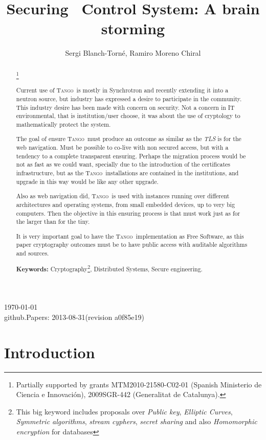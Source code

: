 \documentclass[10pt,a4paper,twoside]{llncs}
\title{Securing \tango\, Control System: A brain storming}
\author{Sergi Blanch-Torn\'e\inst{1}, Ramiro Moreno Chiral\inst{2}}
\institute{
 Escola Polit\`ecnica Superior, Universitat de Lleida. Spain.\\
 \email{\tt sblanch@alumnes.udl.es}
 \and 
 Departament de Matem\`atica. Universitat de Lleida. Spain.\\
 \email{\tt ramiro@matematica.udl.es}
 }
\newcommand{\version}{github.Papers: 2013-08-31\;(revision a0f85e19) } %
\newcommand{\tango}{\textsc{Tango}}
\begin{document}
\maketitle
\begin{center}
 \today\\
 \version
\end{center}


\begin{abstract}\footnote{Partially supported by grants MTM2010-21580-C02-01 (Spanish Ministerio de Ciencia e Innovaci\'on), 2009SGR-442 (Generalitat de Catalunya).}

Current use of \tango\, is mostly in Synchrotron and recently extending it into a neutron source, but industry has expressed a desire to participate in the community. This industry desire has been made with concern on security. Not a concern in IT environmental, that is institution/user choose, it was about the use of cryptology to mathematically protect the system.

The goal of ensure \tango\, must produce an outcome as similar as the \emph{TLS} is for the web navigation. Must be possible to co-live with non secured access, but with a tendency to a complete transparent ensuring. Perhaps the migration process would be not as fast as we could want, specially due to the introduction of the certificates infrastructure, but as the \tango\, installations are contained in the institutions, and upgrade in this way would be like any other upgrade.

Also as web navigation did, \tango\, is used with instances running over different architectures and operating systems, from small embedded devices, up to very big computers. Then the objective in this ensuring process is that must work just as for the larger than for the tiny.

It is very important goal to have the \tango\, implementation as Free Software, as this paper cryptography outcomes must be to have public access with auditable algorithms and sources.
   
{\bf Keywords:} Cryptography\footnote{This big keyword includes proposals over \emph{Public key}, \emph{Elliptic Curves}, \emph{Symmetric algorithms}, \emph{stream cyphers}, \emph{secret sharing} and also \emph{Homomorphic encryption} for databases}, Distributed Systems, Secure engineering.

\end{abstract}

%
\section{Introduction \label{sec:introduction}}
\end{document}

